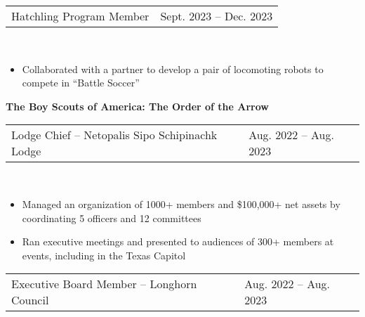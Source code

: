 \documentclass[18pt]{article}
\begin{document}
    \vspace{-0.5\baselineskip}

    \begin{tabular}{p{} p{} }
        Hatchling Program Member
        &\hfill Sept. 2023 – Dec. 2023
    \end{tabular}\\

    \vspace{-0.75\baselineskip}
    \begin{itemize}[noitemsep]
        \vspace{-\baselineskip}
        
        \item Collaborated with a partner to develop a pair of locomoting robots to compete in “Battle Soccer” 
        \vspace{-0.75\baselineskip}
    \end{itemize}


    \textbf{The Boy Scouts of America: The Order of the Arrow }\\

    \vspace{-\baselineskip}
    \begin{tabular}{p{} p{} }
        Lodge Chief – Netopalis Sipo Schipinachk Lodge
        &\hfill Aug. 2022 – Aug. 2023
    \end{tabular}\\

    \vspace{-0.75\baselineskip}
    \begin{itemize}[noitemsep]
        \vspace{-\baselineskip}
        \item Managed an organization of 1000+ members and \$100,000+ net assets by coordinating 5 officers and 12 committees
        \item Ran executive meetings and presented to audiences of 300+ members at events, including in the Texas Capitol 
        \vspace{-0.5\baselineskip}
    \end{itemize}


    \begin{tabular}{p{} p{} }
        Executive Board Member – Longhorn Council
        &\hfill Aug. 2022 – Aug. 2023
    \end{tabular}\\
\end{document}
